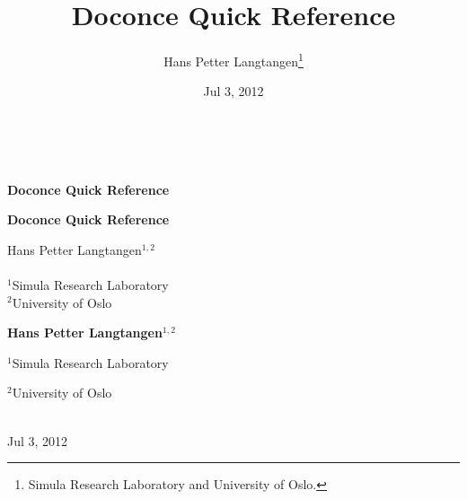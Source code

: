 \documentclass{book}
\begin{document}


\title{Doconce Quick Reference}


\thispagestyle{empty}
\hbox{\ \ }
\vfill
\begin{center}
{\huge{\bfseries{Doconce Quick Reference}}}


\begin{center}
{\LARGE\bf Doconce Quick Reference}
\end{center}




\author{Hans Petter Langtangen\footnote{Simula Research Laboratory and University of Oslo.}}

\vspace{1.3cm}

{\Large\textsf{Hans Petter Langtangen${}^{1, 2}$}}\\ [3mm]

\ \\ [2mm]

{\large\textsf{${}^1$Simula Research Laboratory} \\ [1.5mm]}
{\large\textsf{${}^2$University of Oslo} \\ [1.5mm]}


\begin{center}
{\bf Hans Petter Langtangen${}^{1, 2}$} \\ [0mm]
\end{center}

\begin{center}
\centerline{{\small ${}^1$Simula Research Laboratory}}
\centerline{{\small ${}^2$University of Oslo}}
\end{center}





\date{Jul 3, 2012}
\maketitle


\ \\ [10mm]
{\large\textsf{Jul 3, 2012}}

\end{center}
\vfill
\clearpage
\end{document}
